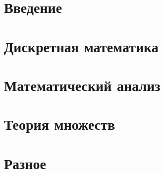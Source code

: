 \documentclass{report}
\begin{document}
\chapter*{Введение}

\tableofcontents
\chapter{Дискретная математика}

\chapter{Математический анализ}

\chapter{Теория множеств}

\chapter{Разное}
\end{document}
